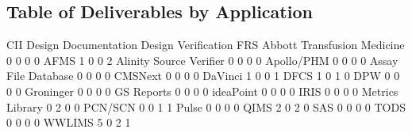 \documentclass{article}
\begin{document}
\subsection{Table of Deliverables by Application}
\begin{Schunk}
\begin{Soutput}
                              CII Design Documentation Design Verification FRS
  Abbott Transfusion Medicine   0                    0                   0   0
  AFMS                          1                    0                   0   2
  Alinity Source Verifier       0                    0                   0   0
  Apollo/PHM                    0                    0                   0   0
  Assay File Database           0                    0                   0   0
  CMSNext                       0                    0                   0   0
  DaVinci                       1                    0                   0   1
  DFCS                          1                    0                   1   0
  DPW                           0                    0                   0   0
  Groninger                     0                    0                   0   0
  GS Reports                    0                    0                   0   0
  ideaPoint                     0                    0                   0   0
  IRIS                          0                    0                   0   0
  Metrics Library               0                    2                   0   0
  PCN/SCN                       0                    0                   1   1
  Pulse                         0                    0                   0   0
  QIMS                          2                    0                   2   0
  SAS                           0                    0                   0   0
  TODS                          0                    0                   0   0
  WWLIMS                        5                    0                   2   1
                             

\end{Soutput}
\end{Schunk}
\end{document}
